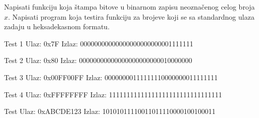 \begin{Exercise}[label=201]
Napisati funkciju  koja štampa bitove u binarnom zapisu neoznačenog celog broja $x$. Napisati program koja testira funkciju  za brojeve koji se sa standardnog ulaza zadaju u heksadekasnom formatu.


\begin{maxitest}
\begin{test}{Test 1}
Ulaz:   0x7F  
Izlaz:  00000000000000000000000001111111    
\end{test}
\end{maxitest}

\begin{maxitest}
\begin{test}{Test 2}
Ulaz:   0x80
Izlaz:  00000000000000000000000010000000 
\end{test}
\end{maxitest}

\begin{maxitest}
\begin{test}{Test 3}
Ulaz:   0x00FF00FF
Izlaz:  00000000111111110000000011111111
\end{test}
\end{maxitest}

\begin{maxitest}
\begin{test}{Test 4}
Ulaz:   0xFFFFFFFF
Izlaz:  11111111111111111111111111111111 
\end{test}
\end{maxitest}

\begin{maxitest}
\begin{test}{Test }
Ulaz:   0xABCDE123
Izlaz:  10101011110011011110000100100011
\end{test}
\end{maxitest}

\end{Exercise}
\begin{Answer}[ref=201]
\end{Answer}

